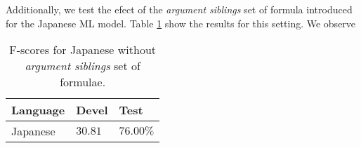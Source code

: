 Additionally, we test the efect of the \emph{argument siblings} set of formula 
introduced for the Japanese ML model. Table \ref{tbl:japanese} show the results 
for this setting. We observe  


\begin{table}
\begin{center}
\small
\begin{tabular}{|l|l|l|}\hline
Language           & Devel        & Test       \\\hline\hline
Japanese           & $30.81$      & $76.00\%$  \\ %
\hline
\end{tabular}
\caption{F-scores for Japanese without \emph{argument siblings} set of 
formulae.}
\label{tbl:japanese}
\normalsize
\end{center}
\end{table}






